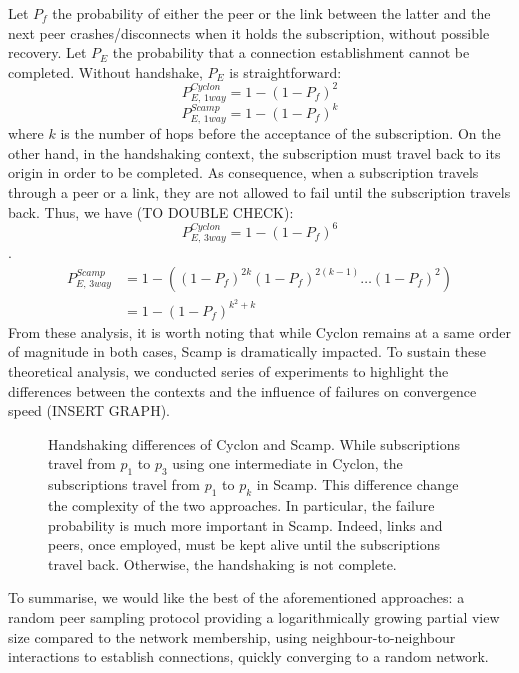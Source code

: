 Let $P_f$ the probability of either the peer or the link between the latter and
the next peer crashes/disconnects when it holds the subscription, without
possible recovery. Let $P_E$ the probability that a connection establishment
cannot be completed. Without handshake, $P_E$ is straightforward:
\begin{equation} P_{E,\,1way}^{Cyclon}=1-(1- P_f)^2 \end{equation}
\begin{equation} P_{E,\,1way}^{Scamp}=1-(1- P_f)^k \end{equation} where $k$ is
the number of hops before the acceptance of the subscription. On the other
hand, in the handshaking context, the subscription must travel back to its
origin in order to be completed. As consequence, when a subscription travels
through a peer or a link, they are not allowed to fail until the subscription
travels back. Thus, we have (TO DOUBLE CHECK):
\begin{equation} P_{E,\,3way}^{Cyclon}=1-(1- P_f)^6\end{equation}.
\begin{align} P_{E,\,3way}^{Scamp} &=1 - ((1-P_f)^{2k} (1-P_f)^{2(k-1)}
                                     \ldots (1-P_f)^2) \\
                                   &=1-(1-P_f)^{k^2+k}
\end{align}
From these analysis, it is worth noting that while Cyclon remains at a same
order of magnitude in both cases, Scamp is dramatically impacted. To sustain
these theoretical analysis, we conducted series of experiments to highlight the
differences between the contexts and the influence of failures on convergence
speed (INSERT GRAPH).

\begin{figure}
  \centering
  
  \caption{\label{fig:failureexample}Handshaking differences of Cyclon and
    Scamp. While subscriptions travel from $p_1$ to $p_3$ using one
    intermediate in Cyclon, the subscriptions travel from $p_1$ to $p_k$ in
    Scamp. This difference change the complexity of the two approaches. In
    particular, the failure probability is much more important in
    Scamp. Indeed, links and peers, once employed, must be kept alive until the
    subscriptions travel back. Otherwise, the handshaking is not complete.}
\end{figure}

To summarise, we would like the best of the aforementioned approaches: a random
peer sampling protocol providing a logarithmically growing partial view size
compared to the network membership, using neighbour-to-neighbour interactions
to establish connections, quickly converging to a random network.

